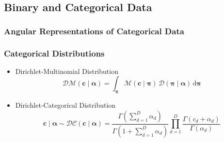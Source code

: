 \documentclass[aspectratio=169,10pt]{beamer}
\begin{document}
\subsection{Binary and Categorical Data}

\subsubsection{Angular Representations of Categorical Data}

\begin{frame}
    \frametitle{Categorical Distributions}
    \begin{itemize}
        \item Dirichlet-Multinomial Distribution
            \[
            \mathcal{DM}(\bm{c}\mid\bm{\alpha}) = 
                \int_{\bm{\pi}}\mathcal{M}(\bm{c}\mid\bm{\pi})\,
                \mathcal{D}(\bm{\pi}\mid\bm{\alpha})\,\text{d}\bm{\pi}
            \]
        \item Dirichlet-Categorical Distribution
            \[
            \bm{c}\mid\bm{\alpha} \sim 
            \mathcal{DC}(\bm{c}\mid\bm{\alpha}) = 
            \frac{
                \Gamma(\sum_{d=1}^D \alpha_{d})
                }{
                \Gamma(1 + \sum_{d = 1}^D\alpha_{d})
                }
            \prod_{d = 1}^D 
            \frac{\Gamma(c_{d} + \alpha_{d})}{\Gamma(\alpha_{d})}
            \]
    \end{itemize}
\end{frame} %
\end{document}
